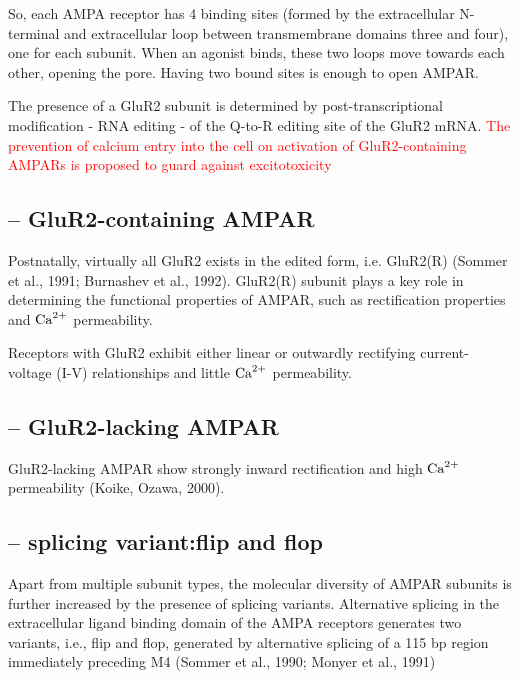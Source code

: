 \begin{mdframed}
So, each AMPA receptor has 4 binding sites (formed by the extracellular
N-terminal and  extracellular loop between transmembrane domains three and
four), one for each subunit. When an agonist binds, these two loops move towards
each other, opening the pore. Having two bound sites is enough to open AMPAR.

The presence of a GluR2 subunit is determined by post-transcriptional
modification - RNA editing - of the Q-to-R editing site of the GluR2 mRNA.
\textcolor{red}{The prevention of calcium entry into the cell on activation of
GluR2-containing AMPARs is proposed to guard against excitotoxicity}

\end{mdframed}

\subsection{-- GluR2-containing AMPAR}
\label{sec:AMPAR-GluR2}
\label{sec:AMPAR-GluR2/3}

Postnatally, virtually all GluR2 exists in the edited form, i.e. GluR2(R)
(Sommer et al., 1991; Burnashev et al., 1992). GluR2(R) subunit plays a key role
in determining the functional properties of AMPAR, such as rectification
properties and ${\text{Ca}^{2+}}$ permeability.

Receptors with GluR2 exhibit either linear or outwardly rectifying
current-voltage (I-V) relationships and little ${\text{Ca}^{2+}}$ permeability.

\subsection{-- GluR2-lacking AMPAR}
\label{sec:AMPAR-GluR1}
\label{sec:AMPAR-GluR3}

GluR2-lacking AMPAR show strongly inward rectification and high ${\text{Ca}^{2+}}$
permeability (Koike, Ozawa, 2000).


\subsection{-- splicing variant:flip and flop}
\label{sec:AMPAR-flip-flop}

Apart from multiple subunit types, the molecular diversity of AMPAR subunits is
further increased by the presence of splicing variants. Alternative splicing in
the extracellular ligand binding domain of the AMPA receptors generates two
variants, i.e., flip and flop, generated by alternative splicing of a 115 bp
region immediately preceding M4 (Sommer et al., 1990; Monyer et al., 1991)


